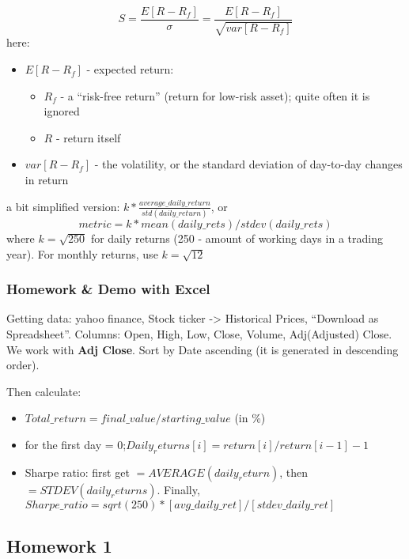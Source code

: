 \documentclass{scrartcl}
\begin{document}
$$S = \frac{E[R-R_f]}{\sigma} = \frac{E[R-R_f]}{\sqrt{var[R-R_f]}} $$
here:
\begin{itemize}
\item $E[R - R_f]$ - expected return:
  \begin{itemize}
  \item $R_f$ - a ``risk-free return'' (return for low-risk asset); quite often
    it is ignored
  \item $R$ - return itself
  \end{itemize}
\item $var[R-R_f]$ - the volatility, or the standard deviation of day-to-day
  changes in return
\end{itemize}
a bit simplified version: $k *
\frac{average\_daily\_return}{std(daily\_return)}$, or
$$ metric = k * mean(daily\_rets)/stdev(daily\_rets)$$
where $k = \sqrt{250}$ for daily returns (250 - amount of working days in a
trading year). For monthly returns, use $k = \sqrt{12}$

\subsubsection{Homework \& Demo with Excel}
\label{sec:Excel}
Getting data: yahoo finance, Stock ticker -> Historical Prices, ``Download as
Spreadsheet''. Columns: Open, High, Low, Close, Volume, Adj(Adjusted) Close. We
work with {\bf Adj Close}. Sort by Date ascending (it is generated in descending
order).

Then calculate:
\begin{itemize}
\item $Total\_return=final\_value/starting\_value$ (in \%)
\item for the first day = 0;$Daily_returns[i] = return[i]/return[i-1] - 1$
\item Sharpe ratio: first get $=AVERAGE(daily_return)$, then
  $=STDEV(daily_returns)$. Finally,
  $Sharpe\_ratio=sqrt(250)*[avg\_daily\_ret]/[stdev\_daily\_ret]$
\end{itemize}

\subsection{Homework 1}
\label{sec:Homework1}
\end{document}
